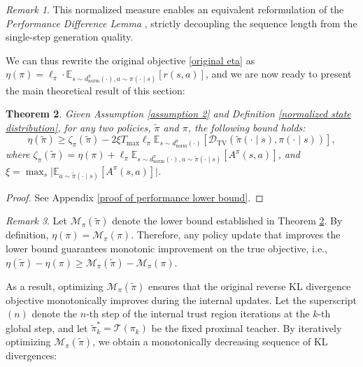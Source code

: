 \documentclass{article}
\theoremstyle{plain}
\newtheorem{theorem}{Theorem}[section]
\theoremstyle{definition}
\theoremstyle{remark}
\newtheorem{remark}[theorem]{Remark}
\begin{document}
\begin{remark}
	This normalized measure enables an equivalent reformulation of the \textit{Performance Difference Lemma} \citep{kakade2002approximately}, strictly decoupling the sequence length from the single-step generation quality.
\end{remark}
We can thus rewrite the original objective \eqref{original eta} as $\eta(\pi)=\ell_{\pi}\cdot\mathbb{E}_{s \sim d^{\pi}_{\mathrm{norm}}(\cdot), a \sim\pi(\cdot \mid s)} \left[r(s,a)\right]$, and we are now ready to present the main theoretical result of this section:
\begin{theorem}\label{performance lower bound}
	Given Assumption \ref{assumption 2} and Definition \ref{normalized state distribution}, for any two policies, $\tilde{\pi}$ and $\pi$, the following bound holds:
	\begin{equation}
		\eta(\tilde{\pi})\geq\zeta_\pi(\tilde{\pi}) - 2\xi T_{\max}\ell_\pi\mathbb{E}_{s \sim d^{\pi}_{\mathrm{norm}}(\cdot)}\left[\mathcal{D}_{\mathrm{TV}}(\tilde{\pi}(\cdot \mid s),\pi(\cdot \mid s))\right],
	\end{equation}
	where $\zeta_\pi(\tilde{\pi})=\eta(\pi) + \ell_\pi\mathbb{E}_{s \sim d^\pi_{\mathrm{norm}}(\cdot), a \sim \tilde{\pi}(\cdot \mid s)} \left[ A^\pi(s, a) \right]$, and $\xi=\max_{s}\lvert\mathbb{E}_{a\sim\tilde{\pi}(\cdot\mid s)}\left[A^\pi(s,a)\right]\rvert$.
\end{theorem}
\begin{proof}
	See Appendix \ref{proof of performance lower bound}.
\end{proof}
\begin{remark}
	Let $\mathcal{M}_{\pi}(\tilde{\pi})$ denote the lower bound established in Theorem \ref{performance lower bound}. By definition, $\eta(\pi)=\mathcal{M}_{\pi}(\pi)$. Therefore, any policy update that improves the lower bound guarantees monotonic improvement on the true objective, i.e., $\eta(\tilde{\pi}) - \eta(\pi) \geq \mathcal{M}_\pi(\tilde{\pi}) - \mathcal{M}_\pi(\pi)$.
\end{remark}
As a result, optimizing $\mathcal{M}_{\pi}(\tilde{\pi})$ ensures that the original reverse KL divergence objective monotonically improves during the internal updates. Let the superscript $(n)$ denote the $n$-th step of the internal trust region iterations at the $k$-th global step, and let $\tilde{\pi}_k^* = \mathcal{T}(\pi_k)$ be the fixed proximal teacher. By iteratively optimizing $\mathcal{M}_{\pi}(\tilde{\pi})$, we obtain a monotonically decreasing sequence of KL divergences:
\end{document}
